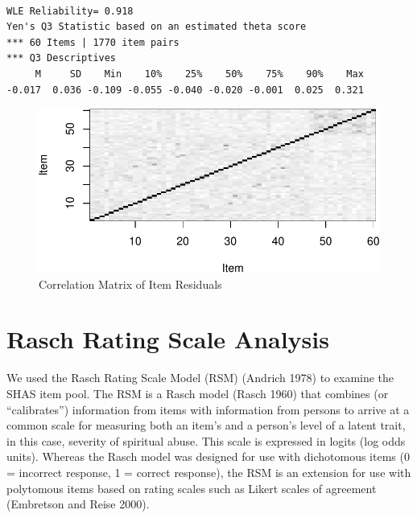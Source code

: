 \documentclass[
  letterpaper,
  DIV=11,
  numbers=noendperiod]{scrreport}
\begin{document}
\begin{verbatim}

WLE Reliability= 0.918 
Yen's Q3 Statistic based on an estimated theta score 
*** 60 Items | 1770 item pairs
*** Q3 Descriptives
     M     SD    Min    10%    25%    50%    75%    90%    Max 
-0.017  0.036 -0.109 -0.055 -0.040 -0.020 -0.001  0.025  0.321 
\end{verbatim}

\begin{figure}

{\centering \includegraphics{./results_files/figure-pdf/fig-q3-1.pdf}

}

\caption{\label{fig-q3}Correlation Matrix of Item Residuals}

\end{figure}

\hypertarget{rasch-rating-scale-analysis}{%
\section*{Rasch Rating Scale
Analysis}\label{rasch-rating-scale-analysis}}

We used the Rasch Rating Scale Model (RSM) (Andrich 1978) to examine the
SHAS item pool. The RSM is a Rasch model (Rasch 1960) that combines (or
``calibrates'') information from items with information from persons to
arrive at a common scale for measuring both an item's and a person's
level of a latent trait, in this case, severity of spiritual abuse. This
scale is expressed in logits (log odds units). Whereas the Rasch model
was designed for use with dichotomous items (0 = incorrect response, 1 =
correct response), the RSM is an extension for use with polytomous items
based on rating scales such as Likert scales of agreement (Embretson and
Reise 2000).
\end{document}
